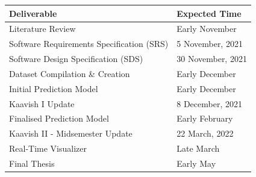 \documentclass[11pt]{article}
\begin{document}
\begin{center}
\begin{tabular}{|l|l|}
\hline
 \textbf{Deliverable} & \textbf{Expected Time}  \\
 \hline \hline
 Literature Review & Early November\\
 Software Requirements Specification (SRS) &  5 November, 2021\\
 Software Design Specification (SDS) &  30 November, 2021  \\
 Dataset Compilation \& Creation &  Early December  \\
 Initial Prediction Model &  Early December  \\
 Kaavish I Update &  8 December, 2021  \\
 Finalised Prediction Model &  Early February  \\
 Kaavish II - Midsemester Update &  22 March, 2022  \\
 Real-Time Visualizer &  Late March  \\
 Final Thesis &  Early May  \\
\hline
\end{tabular}
\end{center}
\end{document}

